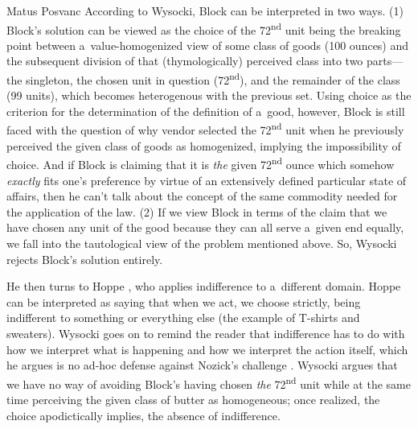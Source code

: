 \begin{artengenv}{Matus Posvanc}
According to Wysocki, Block 
\parencite*[][]{Block1980On} %
 can be interpreted in two ways. (1) Block's solution can be viewed as the choice of the 72\textsuperscript{nd} unit being the breaking point between a~value-homogenized view of some class of goods (100 ounces) and the subsequent division of that (thymologically) perceived class into two parts---the singleton, the chosen unit in question (72\textsuperscript{nd}), and the remainder of the class (99 units), which becomes heterogenous with the previous set. Using choice as the criterion for the determination of the definition of a~good, however, Block is still faced with the question of why vendor selected the 72\textsuperscript{nd} unit when he previously perceived the given class of goods as homogenized, implying the impossibility of choice. And if Block is claiming that it is \textit{the} given 72\textsuperscript{nd} ounce which somehow \textit{exactly} fits one's preference by virtue of an extensively defined particular state of affairs, then he can't talk about the concept of the same commodity needed for the application of the law. (2) If we view Block in terms of the claim that we have chosen any unit of the good because they can all serve a~given end equally, we fall into the tautological view of the problem mentioned above. So, Wysocki rejects Block's solution entirely.



He then turns to Hoppe 
\parencite*[][]{Hoppe2005Must}, %
 who applies indifference to a~different domain. Hoppe can be interpreted as saying that when we act, we choose strictly, being indifferent to something or everything else (the example of T-shirts and sweaters). Wysocki goes on to remind the reader that indifference has to do with how we interpret what is happening and how we interpret the action itself, which he argues is no ad-hoc defense against Nozick's challenge 
\parencite[][see footnote 27]{Wysocki2021problem}. %
 Wysocki argues that we have no way of avoiding Block's having chosen \textit{the} 72\textsuperscript{nd} unit while at the same time perceiving the given class of butter as homogeneous; once realized, the choice apodictically implies, the absence of indifference.




\end{artengenv}

